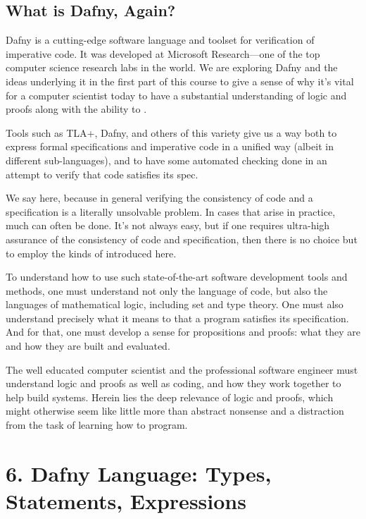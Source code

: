 \documentclass[letterpaper,10pt,english]{sphinxmanual}
\begin{document}
\section{What is Dafny, Again?}
\label{\detokenize{05-verifying-logical-specifications:what-is-dafny-again}}
Dafny is a cutting-edge software language and toolset for verification
of imperative code. It was developed at Microsoft Research—one of
the top computer science research labs in the world. We are exploring
Dafny and the ideas underlying it in the first part of this course to
give a sense of why it’s vital for a computer scientist today to have
a substantial understanding of logic and proofs along with the ability
to .

Tools such as TLA+, Dafny, and others of this variety give us a way
both to express formal specifications and imperative code in a unified
way (albeit in different sub-languages), and to have some automated
checking done in an attempt to verify that code satisfies its spec.

We say  here, because in general verifying the consistency of
code and a specification is a literally unsolvable problem. In cases
that arise in practice, much can often be done. It’s not always easy,
but if one requires ultra-high assurance of the consistency of code
and specification, then there is no choice but to employ the kinds of
 introduced here.

To understand how to use such state-of-the-art software development
tools and methods, one must understand not only the language of code,
but also the languages of mathematical logic, including set and type
theory. One must also understand precisely what it means to 
that a program satisfies its specification. And for that, one must
develop a sense for propositions and proofs: what they are and how
they are built and evaluated.

The well educated computer scientist and the professional software
engineer must understand logic and proofs as well as coding, and how
they work together to help build  systems. Herein lies
the deep relevance of logic and proofs, which might otherwise seem
like little more than abstract nonsense and a distraction from the
task of learning how to program.


\chapter{6. Dafny Language: Types, Statements, Expressions}
\label{\detokenize{06-dafny-language:dafny-language-types-statements-expressions}}\label{\detokenize{06-dafny-language::doc}}
\end{document}

